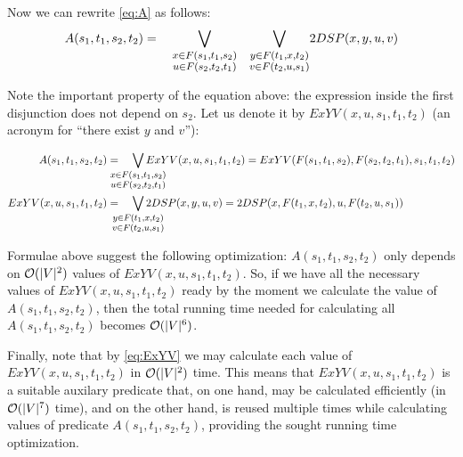 Now we can rewrite \eqref{eq:A} as follows:
\begin{equation} 
    A(s_1, t_1, s_2, t_2) = \quad
        {\bigvee_{
        \large \substack{
            x \in F(s_1, t_1, s_2)\\ 
            u \in F(s_2, t_2, t_1) 
        }
        }}
        \quad
        {\bigvee_{
        \large \substack{
            y \in F(t_1, x, t_2)\\ 
            v \in F(t_2, u, s_1) 
        }
        }} 2DSP(x, y, u, v)
\end{equation}

Note the important property of the equation above: the expression inside the first disjunction does not depend on $s_2$. Let us denote it by $ExYV(x, u, s_1, t_1, t_2)$ (an acronym for ``there exist $y$ and $v$''):

\begin{align} \label{eq:ExYV}
    A(s_1, t_1, s_2, t_2) &= \quad
       \smashoperator{\bigvee_{
        \large \substack{
            x \in F(s_1, t_1, s_2)\\ 
            u \in F(s_2, t_2, t_1) 
        }
        }} ExYV(x, u, s_1, t_1, t_2) = ExYV(F(s_1, t_1, s_2), F(s_2, t_2, t_1), s_1, t_1, t_2)\\
    ExYV(x, u, s_1, t_1, t_2) &= \quad
        \smashoperator{\bigvee_{
        \large \substack{
            y \in F(t_1, x, t_2)\\ 
            v \in F(t_2, u, s_1) 
        }
        }} 2DSP(x, y, u, v) = 2DSP(x, F(t_1, x, t_2), u, F(t_2, u, s_1))\\ 
\end{align}

Formulae above suggest the following optimization: $A(s_1, t_1, s_2, t_2)$ only depends on $\mathcal{O}(|V|^2)$ values of $ExYV(x, u, s_1, t_1, t_2)$. So, if we have all the necessary values of $ExYV(x, u, s_1, t_1, t_2)$ ready by the moment we calculate the value of $A(s_1, t_1, s_2, t_2)$, then the total running time needed for calculating all $A(s_1, t_1, s_2, t_2)$ becomes $\mathcal{O}(|V|^6)$.

Finally, note that by \eqref{eq:ExYV} we may calculate each value of $ExYV(x, u, s_1, t_1, t_2)$ in $\mathcal{O}(|V|^2)$ time. This means that $ExYV(x, u, s_1, t_1, t_2)$ is a suitable auxilary predicate that, on one hand, may be calculated efficiently (in $\mathcal{O}(|V|^7)$ time), and on the other hand, is reused multiple times while calculating values of predicate $A(s_1, t_1, s_2, t_2)$, providing the sought running time optimization.

